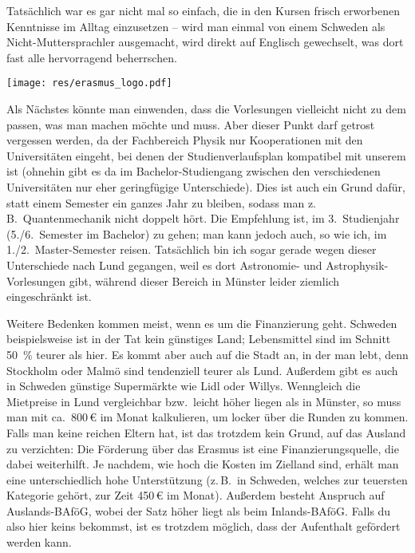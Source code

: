 \begin{multicols}{2}
Tatsächlich war es gar nicht mal so einfach, die in den Kursen frisch erworbenen Kenntnisse im Alltag einzusetzen – wird man einmal von einem Schweden als Nicht-Muttersprachler ausgemacht, wird direkt auf Englisch gewechselt, was dort fast alle hervorragend beherrschen.

\begin{center}
	\texttt{[image: res/erasmus\_logo.pdf]}
\end{center}

Als Nächstes könnte man einwenden, dass die Vorlesungen vielleicht nicht zu dem passen, was man machen möchte und muss.
Aber dieser Punkt darf getrost vergessen werden, da der Fachbereich Physik nur Kooperationen mit den Universitäten eingeht, bei denen der Studienverlaufsplan kompatibel mit unserem ist (ohnehin gibt es da im Bachelor-Studiengang zwischen den verschiedenen Universitäten nur eher geringfügige Unterschiede).
Dies ist auch ein Grund dafür, statt einem Semester ein ganzes Jahr zu bleiben, sodass man z.\,B.\ Quantenmechanik nicht doppelt hört.
Die Empfehlung ist, im 3.~Studienjahr (5./6.~Semester im Bachelor) zu gehen; man kann jedoch auch, so wie ich, im 1./2.~Master-Semester reisen.
Tatsächlich bin ich sogar gerade wegen dieser Unterschiede nach Lund gegangen, weil es dort Astronomie- und Astrophysik-Vorlesungen gibt, während dieser Bereich in Münster leider ziemlich eingeschränkt ist.

Weitere Bedenken kommen meist, wenn es um die Finanzierung geht.
Schweden beispielsweise ist in der Tat kein günstiges Land; Lebensmittel sind im Schnitt \SI{50}{\percent} teurer als hier. Es kommt aber auch auf die Stadt an, in der man lebt, denn Stockholm oder Malmö sind tendenziell teurer als Lund. Außerdem gibt es auch in Schweden günstige Supermärkte wie Lidl oder Willys.
Wenngleich die Mietpreise in Lund vergleichbar bzw.\ leicht höher liegen als in Münster, so muss man mit ca.~800\,€ im Monat kalkulieren, um locker über die Runden zu kommen.
Falls man keine reichen Eltern hat, ist das trotzdem kein Grund, auf das Ausland zu verzichten:
Die Förderung über das Erasmus ist eine Finanzierungsquelle, die dabei weiterhilft.
Je nachdem, wie hoch die Kosten im Zielland sind, erhält man eine unterschiedlich hohe Unterstützung (z.\,B.\ in Schweden, welches zur teuersten Kategorie gehört, zur Zeit 450\,€ im Monat).
Außerdem besteht Anspruch auf Auslands-BAföG, wobei der Satz höher liegt als beim Inlands-BAföG.
Falls du also hier keins bekommst, ist es trotzdem möglich, dass der Aufenthalt gefördert werden kann.


\end{multicols}
